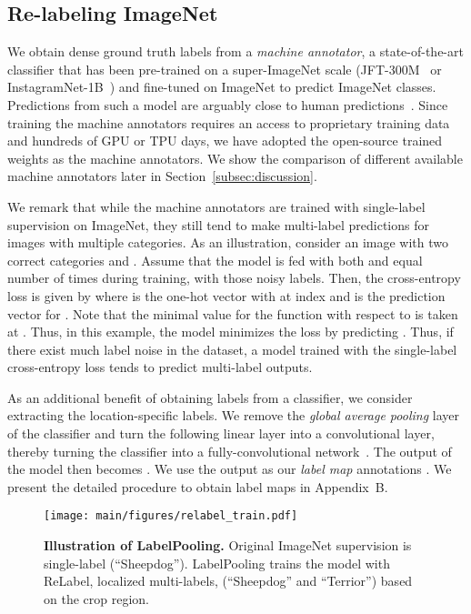 \documentclass[final]{cvpr}
\newcommand\ours{{{\mbox{ReLabel}}}\xspace}
\newcommand\ourframework{{{LabelPooling}}\xspace}
\begin{document}
\subsection{Re-labeling ImageNet}

We obtain dense ground truth labels from a \textit{machine annotator}, a state-of-the-art classifier that has been pre-trained on a super-ImageNet scale (\eg JFT-300M~\cite{sun2017revisiting} or InstagramNet-1B~\cite{InstagramNet}) and fine-tuned on ImageNet to predict ImageNet classes.
Predictions from such a model are arguably close to human predictions~\cite{beyer2020are_we_done}. Since training the machine annotators requires an access to proprietary training data~\cite{sun2017revisiting,InstagramNet} and hundreds of GPU or TPU days, we have adopted the open-source trained weights as the machine annotators.
We show the comparison of different available machine annotators later in Section~\ref{subsec:discussion}.

We remark that while the machine annotators are trained with single-label supervision on ImageNet, they still tend to make multi-label predictions for images with multiple categories. As an illustration, consider an image  with two correct categories  and . Assume that the model is fed with both  and  equal number of times during training, with those noisy labels. Then, the cross-entropy loss is given by  where  is the one-hot vector with  at index  and  is the prediction vector for . Note that the minimal value for the function  with respect to  is taken at . Thus, in this example, the model minimizes the loss by predicting .
Thus, if there exist much label noise in the dataset, a model trained with the single-label cross-entropy loss tends to predict multi-label outputs.

As an additional benefit of obtaining labels from a classifier, we consider extracting the location-specific labels. 
We remove the \emph{global average pooling} layer of the classifier and turn the following linear layer into a  convolutional layer, thereby turning the classifier into a fully-convolutional network~\cite{zhou2016CAM,FCN}. 
The output of the model then becomes . 
We use the output  as our \textit{label map} annotations .
We present the detailed procedure to obtain label maps in Appendix~B. 



\begin{figure}[t]
\centering
\texttt{[image: main/figures/relabel\_train.pdf]}
\caption{
\textbf{Illustration of  \ourframework.}
Original ImageNet supervision is single-label (``Sheepdog''). \ourframework trains the model with \ours, localized multi-labels, (``Sheepdog'' and ``Terrior'') based on the crop region.
}
\label{fig:framework}
\vspace{-0.2cm}
\end{figure}
\end{document}
